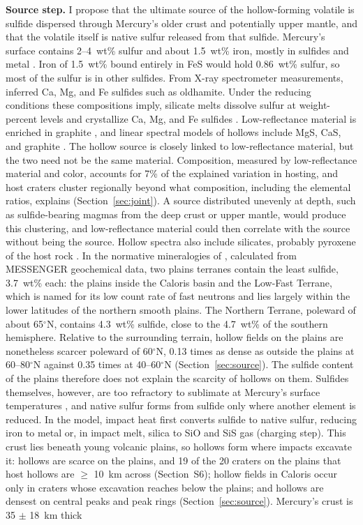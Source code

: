 \documentclass[article,review]{planetary}
\begin{document}
\textbf{Source step.} I propose that the ultimate source of the hollow-forming volatile is sulfide dispersed through Mercury's older crust and potentially upper mantle, and that the volatile itself is native sulfur released from that sulfide. Mercury's surface contains 2--4~wt\% sulfur \parencite{nittler2011,weider2015} and about 1.5~wt\% iron, mostly in sulfides and metal \parencite{weider2014}. Iron of 1.5~wt\% bound entirely in FeS would hold 0.86~wt\% sulfur, so most of the sulfur is in other sulfides. From X-ray spectrometer measurements, \textcite{weiderChemicalHeterogeneityMercurys2012} inferred Ca, Mg, and Fe sulfides such as oldhamite. Under the reducing conditions these compositions imply, silicate melts dissolve sulfur at weight-percent levels and crystallize Ca, Mg, and Fe sulfides \parencite{namur2016,anzures2020,boukare2019}. Low-reflectance material is enriched in graphite \parencite{peplowski2016,klima2018,vanderkaaden2015}, and linear spectral models of hollows include MgS, CaS, and graphite \parencite{emran2025}. The hollow source is closely linked to low-reflectance material, but the two need not be the same material. Composition, measured by low-reflectance material and color, accounts for 7\% of the explained variation in hosting, and host craters cluster regionally beyond what composition, including the elemental ratios, explains (Section~\ref{sec:joint}). A source distributed unevenly at depth, such as sulfide-bearing magmas from the deep crust or upper mantle, would produce this clustering, and low-reflectance material could then correlate with the source without being the source. Hollow spectra also include silicates, probably pyroxene of the host rock \parencite{lucchetti2018}. In the normative mineralogies of \textcite{mccoy2018}, calculated from MESSENGER geochemical data, two plains terranes contain the least sulfide, 3.7~wt\% each: the plains inside the Caloris basin and the Low-Fast Terrane, which is named for its low count rate of fast neutrons and lies largely within the lower latitudes of the northern smooth plains. The Northern Terrane, poleward of about 65$^\circ$N, contains 4.3~wt\% sulfide, close to the 4.7~wt\% of the southern hemisphere. Relative to the surrounding terrain, hollow fields on the plains are nonetheless scarcer poleward of 60$^\circ$N, 0.13 times as dense as outside the plains at 60--80$^\circ$N against 0.35 times at 40--60$^\circ$N (Section~\ref{sec:source}). The sulfide content of the plains therefore does not explain the scarcity of hollows on them. Sulfides themselves, however, are too refractory to sublimate at Mercury's surface temperatures \parencite{phillips2021}, and native sulfur forms from sulfide only where another element is reduced. In the model, impact heat first converts sulfide to native sulfur, reducing iron to metal or, in impact melt, silica to SiO and SiS gas (charging step). This crust lies beneath young volcanic plains, so hollows form where impacts excavate it: hollows are scarce on the plains, and 19 of the 20 craters on the plains that host hollows are $\geq$ 10~km across (Section~S6); hollow fields in Caloris occur only in craters whose excavation reaches below the plains; and hollows are densest on central peaks and peak rings (Section~\ref{sec:source}). Mercury's crust is 35 $\pm$ 18~km thick 
\end{document}
